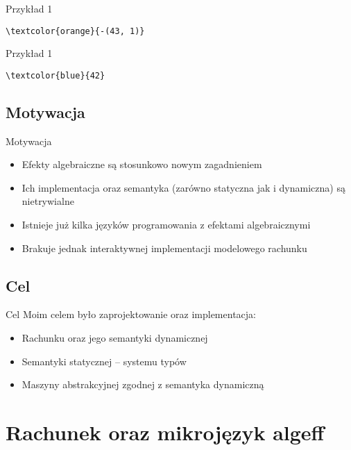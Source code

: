 \documentclass{beamer}
\begin{document}
\begin{frame}[fragile]{Przykład 1}
\begin{Verbatim}[commandchars=\\\{\}]
\textcolor{orange}{-(43, 1)}
\end{Verbatim}
\end{frame}

\begin{frame}[fragile]{Przykład 1}
\begin{Verbatim}[commandchars=\\\{\}]
\textcolor{blue}{42}
\end{Verbatim}
\end{frame}

\subsection{Motywacja}
\begin{frame}{Motywacja}
	\begin{itemize}
		\pause
		\item Efekty algebraiczne są stosunkowo nowym zagadnieniem
		\pause
		\item Ich implementacja oraz semantyka (zarówno statyczna jak i dynamiczna) są nietrywialne
		\pause
		\item Istnieje już kilka języków programowania z efektami algebraicznymi
		\pause
		\item Brakuje jednak interaktywnej implementacji modelowego rachunku
	\end{itemize}
\end{frame}

\subsection{Cel}
\begin{frame}{Cel}
	Moim celem było zaprojektowanie oraz implementacja:
	\begin{itemize}
		\pause
		\item Rachunku oraz jego semantyki dynamicznej
		\pause
		\item Semantyki statycznej -- systemu typów
		\pause
		\item Maszyny abstrakcyjnej zgodnej z semantyka dynamiczną
	\end{itemize}
\end{frame}

\section{Rachunek oraz mikrojęzyk algeff}
\end{document}
